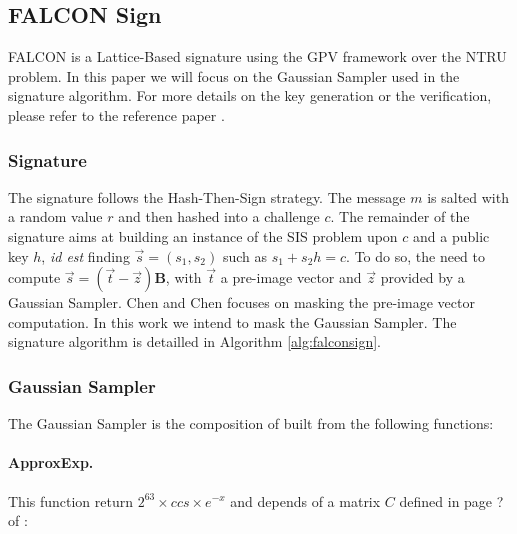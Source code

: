\documentclass[runningheads]{llncs}
\begin{document}
\subsection{FALCON Sign}
FALCON \cite{prest2020falcon} is a Lattice-Based signature using the
GPV framework over the NTRU problem. In this paper we will focus on
the Gaussian Sampler used in the signature algorithm. For more details
on the key generation or the verification, please refer to the
reference paper \cite{prest2020falcon}.

\subsubsection{Signature} The signature follows the Hash-Then-Sign strategy. The message $m$ is salted with a random value $r$ and then hashed into a challenge $c$. The remainder of the signature aims at building an instance of the SIS problem upon $c$ and a public key $h$, \emph{id est} finding $\vec{s} =(s_1,s_2)$ such as $s_1 + s_2 h = c$. To do so, the need to compute $\vec{s} = (\vec{t}-\vec{z})\mathbf{B}$, with $\vec{t}$ a pre-image vector and $\vec{z}$ provided by a Gaussian Sampler. Chen and Chen \cite{Chen_Chen_2024} focuses on masking the pre-image vector computation. In this work we intend to mask the Gaussian Sampler. The signature algorithm is detailled in Algorithm \ref{alg:falconsign}.
%
%
\subsubsection{Gaussian Sampler}

The Gaussian Sampler is the composition of built from the following functions:

\paragraph{ApproxExp.} This function return $2^{63}\times ccs \times e^{-x}$ and depends of a matrix $C$ defined in page ? of \cite{prest2020falcon}:
%
\end{document}
